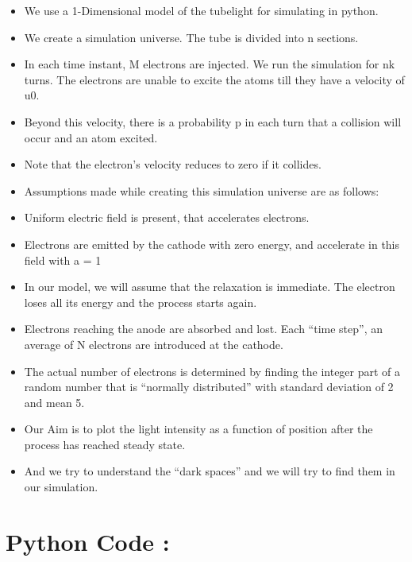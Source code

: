 \documentclass[10pt,notitlepage,onecolumn,aps,pra]{revtex4-1}
\providecommand{\tightlist}{%
      \setlength{\itemsep}{0pt}\setlength{\parskip}{0pt}}
\begin{document}
\begin{itemize}
\tightlist
\item
  We use a 1-Dimensional model of the tubelight for simulating in
  python.
\item
  We create a simulation universe. The tube is divided into n sections.
\item
  In each time instant, M electrons are injected. We run the simulation
  for nk turns. The electrons are unable to excite the atoms till they
  have a velocity of u0.
\item
  Beyond this velocity, there is a probability p in each turn that a
  collision will occur and an atom excited.
\item
  Note that the electron's velocity reduces to zero if it collides.
\item
  Assumptions made while creating this simulation universe are as
  follows:
\item
  Uniform electric field is present, that accelerates electrons.
\item
  Electrons are emitted by the cathode with zero energy, and accelerate
  in this field with a = 1
\item
  In our model, we will assume that the relaxation is immediate. The
  electron loses all its energy and the process starts again.
\item
  Electrons reaching the anode are absorbed and lost. Each ``time
  step'', an average of N electrons are introduced at the cathode.
\item
  The actual number of electrons is determined by finding the integer
  part of a random number that is ``normally distributed'' with standard
  deviation of 2 and mean 5.
\item
  Our Aim is to plot the light intensity as a function of position after
  the process has reached steady state.
\item
  And we try to understand the ``dark spaces'' and we will try to find
  them in our simulation.
\end{itemize}

    \section{Python Code :}\label{python-code}
\end{document}
